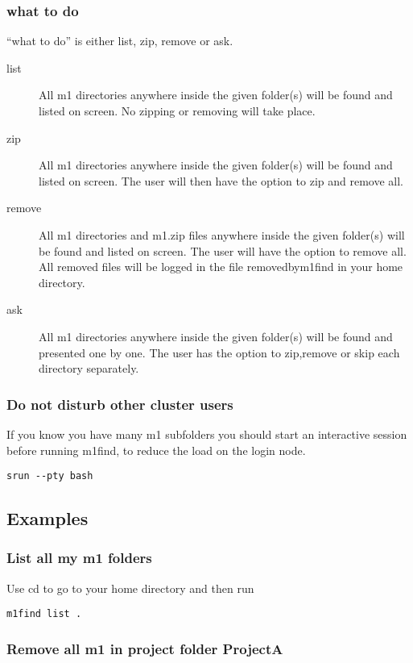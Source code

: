 \documentclass[a4wide,12pt]{article}
\renewcommand{\_}{\textscale{.7}{\textunderscore}}
\begin{document}
\subsubsection*{what to do}
``what to do'' is either list, zip, remove or ask.
\begin{description}
\item[list] All m1 directories anywhere inside the given folder(s) will be found and listed on screen.
         No zipping or removing will take place. 
\item[zip] All m1 directories anywhere inside the given folder(s) will be found and listed on screen.
         The user will then have the option to zip and remove all.
\item[remove] All m1 directories and m1.zip files anywhere inside the given folder(s) will be found and listed on screen.
         The user will have the option to remove all.
         All removed files will be logged in the file removed\_by\_m1find in your home directory.
\item[ask] All m1 directories anywhere inside the given folder(s) will be found and presented one by one.
         The user has the option to zip,remove or skip each directory separately.
\end{description}

\subsubsection*{Do not disturb other cluster users}
If you know you have many m1 subfolders you should start an interactive session before running m1find,
to reduce the load on the login node.
\begin{verbatim}
srun --pty bash
\end{verbatim}

\subsection{Examples}

\subsubsection*{List all my m1 folders}
Use cd to go to your home directory and then run
\begin{verbatim}
m1find list .
\end{verbatim}


\subsubsection*{Remove all m1 in project folder ProjectA}
\end{document}
